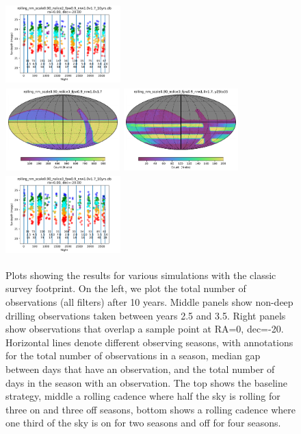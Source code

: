 \documentclass[modern]{aastex62}
\begin{document}
\begin{figure}
\includegraphics[height=1.25in, width=1.75in]{plots/rolling_nm_scale090_nslice2_fpw09_nrw10v17_spotc.pdf}\\
\includegraphics[height=1.25in, width=1.75in]{plots/rolling_nm_scale0.90_nslice3_fpw0.9_nrw1.0v1.7/rolling_nm_scale0_90_nslice3_fpw0_9_nrw1_0v1_7_Count_HEAL_SkyMap.pdf}
\includegraphics[height=1.25in, width=1.75in]{plots/rolling_nm_scale0.90_nslice3_fpw0.9_nrw1.0v1.7/rolling_nm_scale0_90_nslice3_fpw0_9_nrw1_0v1_7_Count_night_gt_913_125000_and_night_lt_1278_375000_and_note_not_like_DD_HEAL_SkyMap.pdf}
\includegraphics[height=1.25in, width=1.75in]{plots/rolling_nm_scale090_nslice3_fpw09_nrw10v17_spotc.pdf}
\caption{Plots showing the results for various simulations with the classic survey footprint. On the left, we plot the total number of observations (all filters) after 10 years. Middle panels show non-deep drilling observations taken between years 2.5 and 3.5. Right panels show observations that overlap a sample point at RA=0, dec=-20. Horizontal lines denote different observing seasons, with annotations for the total number of observations in a season, median gap between days that have an observation, and the total number of days in the season with an observation. The top shows the baseline strategy, middle a rolling cadence where half the sky is rolling for three on and three off seasons, bottom shows a rolling cadence where one third of the sky is on for two seasons and off for four seasons. \label{fig:classics}}
\end{figure}
\end{document}
